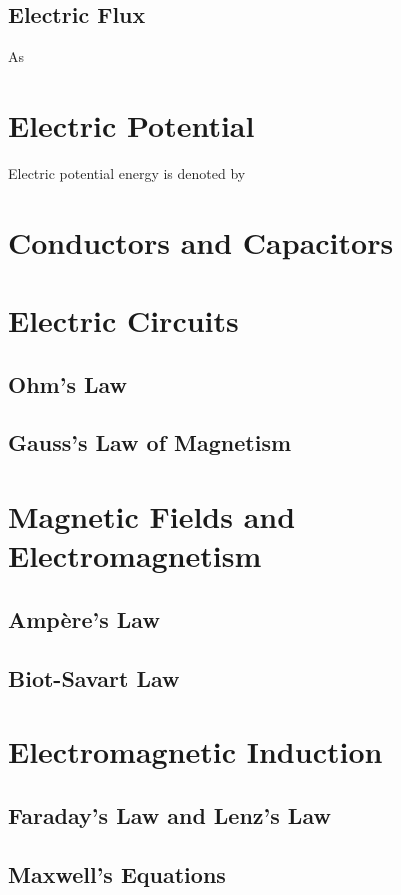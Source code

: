 \documentclass[a4paper, titlepage]{book}
\begin{document}
\section{Electric Flux}

As


\chapter{Electric Potential}

Electric potential energy is denoted by 


\chapter{Conductors and Capacitors}


\chapter{Electric Circuits}

\section{Ohm's Law}

\section{Gauss's Law of Magnetism}


\chapter{Magnetic Fields and Electromagnetism}

\section{Ampère's Law}

\section{Biot-Savart Law}


\chapter{Electromagnetic Induction}

\section{Faraday's Law and Lenz's Law}

\section{Maxwell's Equations}


\appendix





\backmatter
\printbibliography[title={References}]
\end{document}
